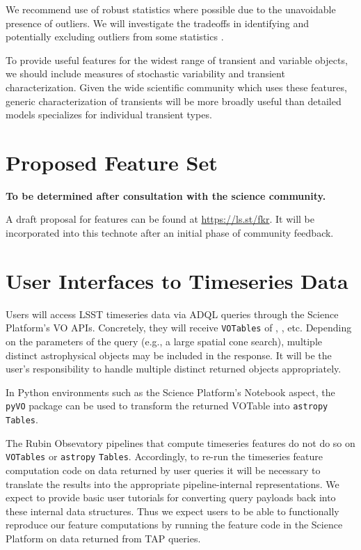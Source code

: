 \documentclass[DM,authoryear,toc]{lsstdoc}
\begin{document}
We recommend use of robust statistics where possible due to the unavoidable presence of outliers.
We will investigate the tradeoffs in identifying and potentially excluding outliers from some statistics \citep[e.g.,][]{Pashchenko:18:OGLEClassification}.

To provide useful features for the widest range of transient and variable objects, we should include measures of stochastic variability and transient characterization.
Given the wide scientific community which uses these features, generic characterization of transients will be more broadly useful than detailed models specializes for individual transient types.

\section{Proposed Feature Set} \label{sec:proposed_features}

\textbf{To be determined after consultation with the science community.}

A draft proposal for features can be found at \url{https://ls.st/fkr}.
It will be incorporated into this technote after an initial phase of community feedback.

\section{User Interfaces to Timeseries Data} \label{sec:API}

Users will access LSST timeseries data via ADQL queries through the Science Platform's VO APIs.
Concretely, they will receive \texttt{VOTables} of \DIAObjects, \DIASources, etc.
Depending on the parameters of the query (e.g., a large spatial cone search), multiple distinct astrophysical objects may be included in the response.
It will be the user's responsibility to handle multiple distinct returned objects appropriately.

In Python environments such as the Science Platform's Notebook aspect, the \texttt{pyVO} package can be used to transform the returned VOTable into \texttt{astropy} \texttt{Tables}.

The Rubin Obsevatory pipelines that compute timeseries features do not do so on \texttt{VOTables} or \texttt{astropy} \texttt{Tables}.
Accordingly, to re-run the timeseries feature computation code on data returned by user queries it will be necessary to translate the results into the appropriate pipeline-internal representations.
We expect to provide basic user tutorials for converting query payloads back into these internal data structures.
Thus we expect users to be able to functionally reproduce our feature computations by running the feature code in the Science Platform on data returned from TAP queries. 
\end{document}
